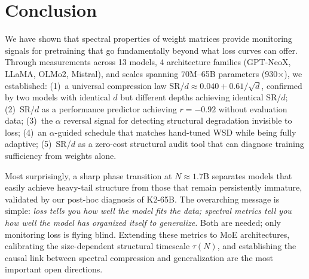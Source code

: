 \section{Conclusion}
\label{sec:conclusion}

We have shown that spectral properties of weight matrices provide monitoring signals for pretraining that go fundamentally beyond what loss curves can offer.
Through measurements across 13 models, 4 architecture families (GPT-NeoX, LLaMA, OLMo2, Mistral), and scales spanning 70M--65B parameters (930$\times$), we established:
(1)~a universal compression law SR/$d \approx 0.040 + 0.61/\sqrt{d}$, confirmed by two models with identical $d$ but different depths achieving identical SR/$d$;
(2)~SR/$d$ as a performance predictor achieving $r = -0.92$ without evaluation data;
(3)~the $\alpha$ reversal signal for detecting structural degradation invisible to loss;
(4)~an $\alpha$-guided schedule that matches hand-tuned WSD while being fully adaptive;
(5)~SR/$d$ as a zero-cost structural audit tool that can diagnose training sufficiency from weights alone.

Most surprisingly, a sharp phase transition at $N \approx 1.7$B separates models that easily achieve heavy-tail structure from those that remain persistently immature, validated by our post-hoc diagnosis of K2-65B.
The overarching message is simple: \emph{loss tells you how well the model fits the data; spectral metrics tell you how well the model has organized itself to generalize.}
Both are needed; only monitoring loss is flying blind.
Extending these metrics to MoE architectures, calibrating the size-dependent structural timescale $\tau(N)$, and establishing the causal link between spectral compression and generalization are the most important open directions.

